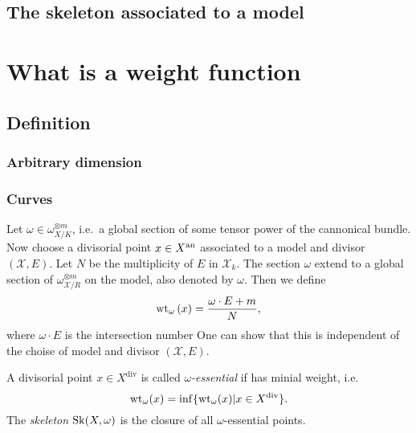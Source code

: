 \subsection{The skeleton associated to a model} \label{sec:the_skeleton_associated_to_a_model}

\section{What is a weight function} \label{sec:what_is_a_weight_function}

\subsection{Definition} \label{sec:definition}

\subsubsection{Arbitrary dimension} \label{sec:arbitrary_dimension}

\subsubsection{Curves} \label{sec:curves}
Let $\omega \in \omega_{X / K}^{\otimes m}$, i.e.\ a global section of some tensor power of the cannonical bundle. 
Now choose a divisorial point $x \in X{}^{\text{an}}$ associated to a model and divisor $(\mathscr X, E)$. 
Let $N$ be the multiplicity of $E$ in $\mathscr X_k$. 
The section $\omega$ extend to a global section of $\omega_{\mathscr X / R} ^{ \otimes m}$ on the model, also denoted by $\omega$. 
Then we define \[
	\operatorname{wt}_{\omega}\left(x  \right)  = \frac{\omega \cdot E + m}{N}
,\] 
where $\omega \cdot E$ is the intersection number 
One can show that this is independent of the choise of model and divisor $(\mathscr X, E)$.  

\begin{definition}
	A divisorial point $x \in X^{\text{div}}$ is called \emph{$\omega$-essential} if has minial weight, i.e. \[
		\operatorname{wt}_\omega(x) = \inf \{\operatorname{wt}_\omega(x) | x \in X^{\text{div}}\} 
	.\] 
	The \emph{skeleton $\operatorname{Sk}(X, \omega)$} is the closure of all $\omega$-essential points.  
\end{definition}

